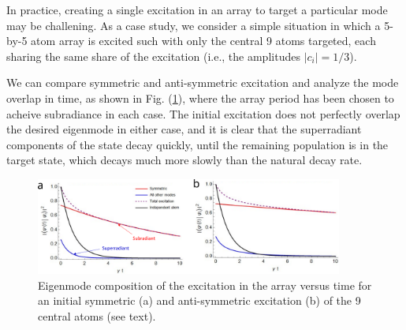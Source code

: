In practice, creating a single excitation in an array to target a particular mode may be challening. As a case study, we consider a simple situation in which a 5-by-5 atom array is excited such with only the central 9 atoms targeted, each sharing the same share of the excitation (i.e., the amplitudes $|c_i|=1/3$).

We can compare symmetric and anti-symmetric excitation and analyze the mode overlap in time, as shown in Fig. (\ref{fig:collective_mode_decay_2d}), where the array period has been chosen to acheive subradiance in each case. The initial excitation does not perfectly overlap the desired eigenmode in either case, and it is clear that the superradiant components of the state decay quickly, until the remaining population is in the target state, which decays much more slowly than the natural decay rate.
\begin{figure}[!ht]
    \centering
    \includegraphics[width=0.9\textwidth]{Images/collective_decay_composition.pdf}
    \caption{Eigenmode composition of the excitation in the array versus time for an initial symmetric (a) and anti-symmetric excitation (b) of the 9 central atoms (see text).}
    \label{fig:collective_mode_decay_2d}
\end{figure}

